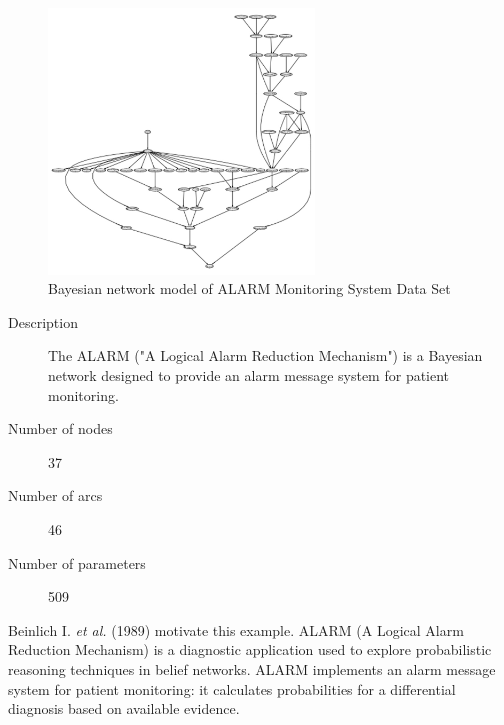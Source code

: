 	\begin{figure}[h]
	\centering
		\includegraphics[height=200pt]{images/Real_Alarm}
		\caption{Bayesian network model of ALARM Monitoring System Data Set}
	\end{figure}	

\begin{description}
	\item[Description] The ALARM ("A Logical Alarm Reduction Mechanism") is a Bayesian network designed to provide an alarm message system for patient monitoring.

	\item[Number of nodes] 37
	
	\item[Number of arcs] 46
	
	\item[Number of parameters] 509
\end{description}

Beinlich I. \emph{et al.} (1989) motivate this example. ALARM (A Logical Alarm Reduction Mechanism) is a diagnostic application used to explore probabilistic reasoning techniques in belief networks. ALARM implements an alarm message system for patient monitoring: it calculates probabilities for a differential diagnosis based on available evidence.

